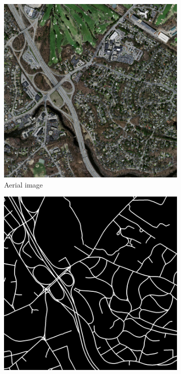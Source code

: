 \begin{figure}
\begin{subfigure}{0.48\textwidth}
\includegraphics[width=\linewidth]{figs/datasets/Mass_roads_data_example2.png}
\caption{Aerial image} \label{fig:mass_roads_example_data}
\end{subfigure}
\hspace*{\fill} %
\begin{subfigure}{0.48\textwidth}
\includegraphics[width=\linewidth]{figs/datasets/Mass_roads_label_example2.png}

\end{subfigure}
\end{figure}
